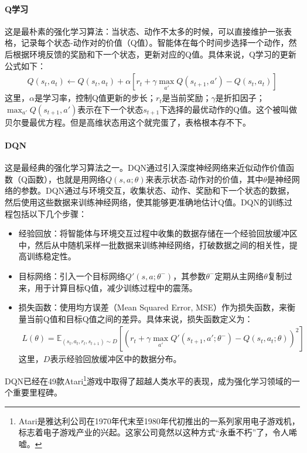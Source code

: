 \paragraph{Q学习} 这是最朴素的强化学习算法：当状态、动作不太多的时候，可以直接维护一张表格，记录每个状态-动作对的价值（Q值）。智能体在每个时间步选择一个动作，然后根据环境反馈的奖励和下一个状态，更新对应的Q值。具体来说，Q学习的更新公式如下：
\begin{align*}
Q(s_t, a_t) \leftarrow Q(s_t, a_t) + \alpha \left[r_t + \gamma \max_{a'} Q(s_{t+1}, a') - Q(s_t, a_t)\right]
\end{align*}
这里，$\alpha$是学习率，控制Q值更新的步长；$r_t$是当前奖励；$\gamma$是折扣因子；$\max_{a'} Q(s_{t+1}, a')$表示在下一个状态$s_{t+1}$下选择的最优动作的Q值。这个被叫做贝尔曼最优方程。但是高维状态用这个就完蛋了，表格根本存不下。

\paragraph{DQN} 这是最经典的强化学习算法之一。DQN通过引入深度神经网络来近似动作价值函数（Q函数），也就是用网络$Q(s, a; \theta)$来表示状态-动作对的价值，其中$\theta$是神经网络的参数。DQN通过与环境交互，收集状态、动作、奖励和下一个状态的数据，然后使用这些数据来训练神经网络，使其能够更准确地估计Q值。DQN的训练过程包括以下几个步骤：
\begin{itemize}
    \item 经验回放：将智能体与环境交互过程中收集的数据存储在一个经验回放缓冲区中，然后从中随机采样一批数据来训练神经网络，打破数据之间的相关性，提高训练稳定性。
    \item 目标网络：引入一个目标网络$Q'(s, a; \theta^-)$，其参数$\theta^-$定期从主网络$\theta$复制过来，用于计算目标Q值，减少训练过程中的震荡。
    \item 损失函数：使用均方误差（Mean Squared Error, MSE）作为损失函数，来衡量当前Q值和目标Q值之间的差异。具体来说，损失函数定义为：
    \begin{align*}
    L(\theta) = \mathbb{E}_{(s_t, a_t, r_t, s_{t+1}) \sim D} \left[\left(r_t + \gamma \max_{a'} Q'(s_{t+1}, a'; \theta^-) - Q(s_t, a_t; \theta)\right)^2\right]
    \end{align*}
    这里，$D$表示经验回放缓冲区中的数据分布。
\end{itemize}
DQN已经在49款Atari\footnote{Atari是雅达利公司在1970年代末至1980年代初推出的一系列家用电子游戏机，标志着电子游戏产业的兴起。这家公司竟然以这种方式“永垂不朽”了，令人唏嘘。}游戏中取得了超越人类水平的表现，成为强化学习领域的一个重要里程碑。


